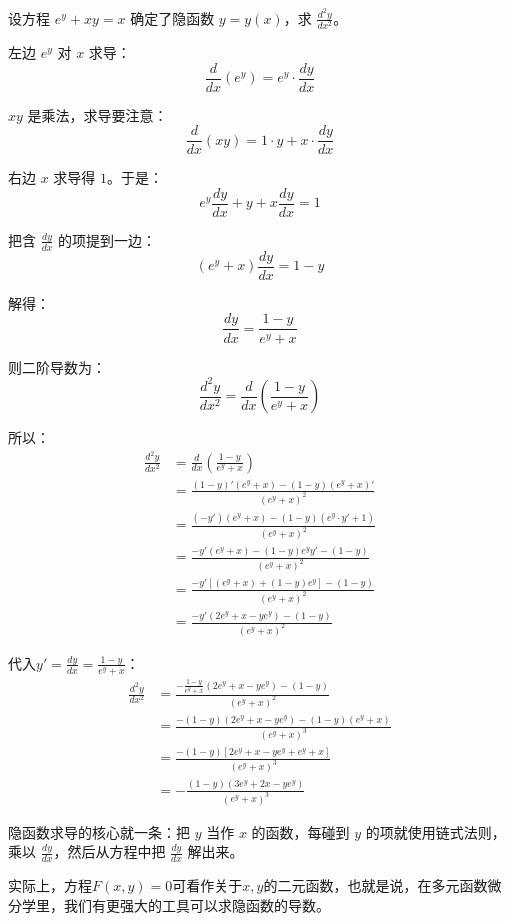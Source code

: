 \begin{myexample}
  设方程 $e^y + xy = x$ 确定了隐函数 $y = y(x)$，求 $\frac{d^2 y}{dx^2}$。
  
  左边 $e^y$ 对 $x$ 求导：
  \[\frac{d}{dx}(e^y) = e^y \cdot \frac{dy}{dx}\]
  
  $xy$ 是乘法，求导要注意：
  \[\frac{d}{dx}(xy) = 1 \cdot y + x \cdot \frac{dy}{dx}\]
  
  右边 $x$ 求导得 $1$。于是：
  \[
  e^y \frac{dy}{dx} + y + x \frac{dy}{dx} = 1
  \]

  把含 $\frac{dy}{dx}$ 的项提到一边：
  \[
  (e^y + x) \frac{dy}{dx} = 1 - y
  \]

  解得：
  \[
  \frac{dy}{dx} = \frac{1 - y}{e^y + x}
  \]

  则二阶导数为：
  \[
  \frac{d^2 y}{dx^2} =\frac{d}{dx} (\frac{1 - y}{e^y + x})
  \]

  所以：
  \[
\begin{aligned}
\frac{d^2y}{dx^2} 
&= \frac{d}{dx}(\frac{1-y}{e^y+x}) \\[6pt]
&= \frac{ (1-y)'(e^y+x) - (1-y)(e^y+x)' }{ (e^y+x)^2 } \\[6pt]
&= \frac{ (-y')(e^y+x) - (1-y)(e^y\cdot y' + 1) }{ (e^y+x)^2 } \\[6pt]
&= \frac{ -y'(e^y+x) - (1-y)e^y y' - (1-y) }{ (e^y+x)^2 } \\[6pt]
&= \frac{ -y'[(e^y+x) + (1-y)e^y] - (1-y) }{ (e^y+x)^2 } \\[6pt]
&= \frac{ -y'(2e^y + x - ye^y) - (1-y) }{ (e^y+x)^2 }
\end{aligned}
\]

代入\(y' = \frac{dy}{dx} = \frac{1-y}{e^y+x}\)：
\[
\begin{aligned}
\frac{d^2y}{dx^2} 
&= \frac{ -\frac{1-y}{e^y+x}( 2e^y + x - ye^y ) - (1-y) }{ (e^y+x)^2 } \\[8pt]
&= \frac{ -(1-y)( 2e^y + x - ye^y ) - (1-y)(e^y+x) }{ (e^y+x)^3 } \\[6pt]
&= \frac{ -(1-y)[ 2e^y + x - ye^y + e^y + x ] }{ (e^y+x)^3 } \\[6pt]
&= -\frac{ (1-y)( 3e^y + 2x - ye^y ) }{ (e^y+x)^3 }
\end{aligned}
\]
\end{myexample}

隐函数求导的核心就一条：把 $y$ 当作 $x$ 的函数，每碰到 $y$ 的项就使用链式法则，乘以 $\frac{dy}{dx}$，然后从方程中把 $\frac{dy}{dx}$ 解出来。

实际上，方程\(F(x, y) = 0\)可看作关于$x,y$的二元函数，也就是说，在多元函数微分学里，我们有更强大的工具可以求隐函数的导数。


